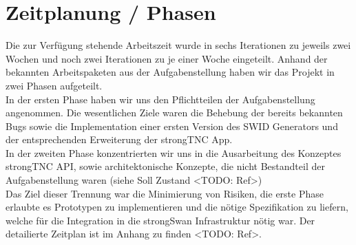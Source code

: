 \section{Zeitplanung / Phasen}
Die zur Verfügung stehende Arbeitszeit wurde in sechs Iterationen zu jeweils
zwei Wochen und noch zwei Iterationen zu je einer Woche eingeteilt. Anhand der
bekannten Arbeitspaketen aus der Aufgabenstellung haben wir das Projekt in zwei
Phasen aufgeteilt.\\
In der ersten Phase haben wir uns den Pflichtteilen der Aufgabenstellung
angenommen. Die wesentlichen Ziele waren die Behebung der bereits bekannten Bugs
sowie die Implementation einer ersten Version des SWID Generators und der
entsprechenden Erweiterung der strongTNC App. \\
In der zweiten Phase konzentrierten wir uns in die Ausarbeitung des Konzeptes
strongTNC API, sowie architektonische Konzepte, die nicht Bestandteil der
Aufgabenstellung waren (siehe Soll Zustand <TODO: Ref>)\\
Das Ziel dieser Trennung war die Minimierung von Risiken, die erste Phase
erlaubte es Prototypen zu implementieren und die nötige Spezifikation zu
liefern, welche für die Integration in die strongSwan Infrastruktur nötig war.
Der detailierte Zeitplan ist im Anhang zu finden <TODO: Ref>.
